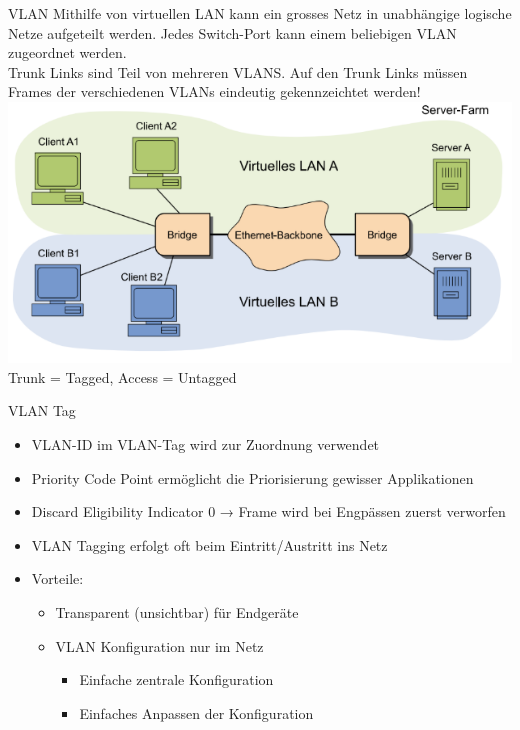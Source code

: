\begin{definition}{VLAN}
    Mithilfe von virtuellen LAN kann ein grosses Netz in unabhängige logische Netze aufgeteilt werden. Jedes Switch-Port kann einem beliebigen VLAN zugeordnet werden.\\
    Trunk Links sind Teil von mehreren VLANS. Auf den Trunk Links müssen Frames der verschiedenen VLANs eindeutig gekennzeichtet werden!\\
        \includegraphics[width=1\linewidth]{images/vlan.png}\\
    Trunk = Tagged, Access = Untagged
\end{definition}

\begin{definition}{VLAN Tag}
    \begin{itemize}
        \item VLAN-ID im VLAN-Tag wird zur Zuordnung verwendet
        \item Priority Code Point ermöglicht die Priorisierung gewisser Applikationen
        \item Discard Eligibility Indicator 0 → Frame wird bei Engpässen zuerst verworfen
        \item VLAN Tagging erfolgt oft beim Eintritt/Austritt ins Netz
        \item Vorteile:
        \begin{itemize}
            \item Transparent (unsichtbar) für Endgeräte
            \item VLAN Konfiguration nur im Netz
            \begin{itemize}
                \item Einfache zentrale Konfiguration
                \item Einfaches Anpassen der Konfiguration
            \end{itemize}
        \end{itemize}
    \end{itemize}
\end{definition}

